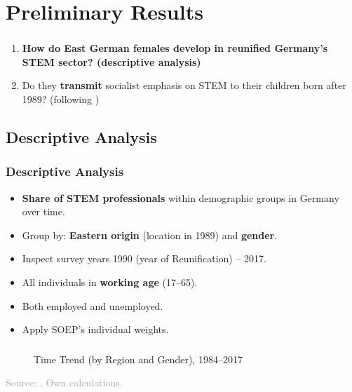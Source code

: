 \documentclass[11pt, aspectratio=1610, xcolor={dvipsnames}]{beamer}
\newcommand{\highlight}[1]{\textbf{\textcolor{PineGreen}{#1}}}
\begin{document}
	\section{Preliminary Results}
	\begin{frame}
		\frametitle{}
		
		\begin{enumerate}
			\item \textbf{How do East German females develop in \highlight{reunified Germany's STEM sector}? (descriptive analysis)}
			\item Do they \highlight{transmit} socialist emphasis on STEM to their children born after 1989? (following \cite{Fernandez2011})
		\end{enumerate}
		
	\end{frame}
	
	\subsection{Descriptive Analysis}
	\begin{frame}
		\frametitle{Descriptive Analysis}
		
		\begin{itemize}
			\item \highlight{Share of STEM professionals} within demographic groups in Germany over time.
			\item Group by: \highlight{Eastern origin} (location in 1989) and \highlight{gender}.
			\item Inspect survey years 1990 (year of Reunification) -- 2017.
			\item All individuals in \highlight{working age} (17--65).
			\item Both employed and unemployed.
			\item Apply SOEP's individual weights.
		\end{itemize}
		
	\end{frame}
		
	\begin{frame}
		\frametitle{}
		
		\begin{figure}[h]
			\centering
			\caption{Time Trend (by Region and Gender), 1984--2017}
			\label{fig:trend}
			\resizebox{75mm}{!}{}
		\end{figure}
		
		{\scriptsize
			\textcolor{darkgray}{Source: \cite{SOEP2023}. Own calculations.}
		}
	
	\end{frame}
	
\end{document}
